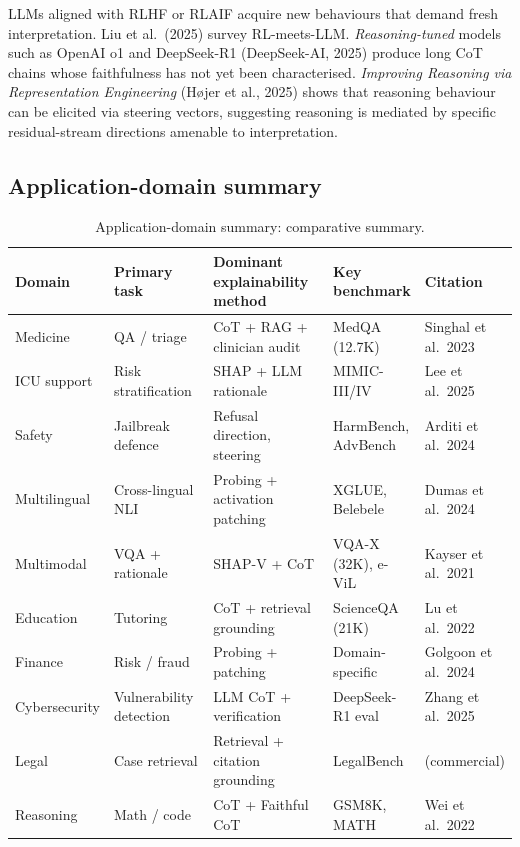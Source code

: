 \documentclass{article}
\begin{document}
LLMs aligned with RLHF or RLAIF acquire new behaviours that demand fresh interpretation. Liu et al.~(2025) survey RL-meets-LLM. \emph{Reasoning-tuned} models such as OpenAI o1 and DeepSeek-R1 (DeepSeek-AI, 2025) produce long CoT chains whose faithfulness has not yet been characterised. \emph{Improving Reasoning via Representation Engineering} (Højer et al., 2025) shows that reasoning behaviour can be elicited via steering vectors, suggesting reasoning is mediated by specific residual-stream directions amenable to interpretation.

\subsection{Application-domain summary}\label{application-domain-summary}

\begin{table}[t]
\centering
\caption{Application-domain summary: comparative summary.}
\label{tab:application-domain-summary}
\begin{tabular}{>{\raggedright\arraybackslash}p{0.1250\linewidth}
  >{\raggedright\arraybackslash}p{0.2212\linewidth}
  >{\raggedright\arraybackslash}p{0.2885\linewidth}
  >{\raggedright\arraybackslash}p{0.1827\linewidth}
  >{\raggedright\arraybackslash}p{0.1827\linewidth}}
\toprule
Domain & Primary task & Dominant explainability method & Key benchmark & Citation \\
\midrule
Medicine & QA / triage & CoT + RAG + clinician audit & MedQA (12.7K) & Singhal et al.~2023 \\
ICU support & Risk stratification & SHAP + LLM rationale & MIMIC-III/IV & Lee et al.~2025 \\
Safety & Jailbreak defence & Refusal direction, steering & HarmBench, AdvBench & Arditi et al.~2024 \\
Multilingual & Cross-lingual NLI & Probing + activation patching & XGLUE, Belebele & Dumas et al.~2024 \\
Multimodal & VQA + rationale & SHAP-V + CoT & VQA-X (32K), e-ViL & Kayser et al.~2021 \\
Education & Tutoring & CoT + retrieval grounding & ScienceQA (21K) & Lu et al.~2022 \\
Finance & Risk / fraud & Probing + patching & Domain-specific & Golgoon et al.~2024 \\
Cybersecurity & Vulnerability detection & LLM CoT + verification & DeepSeek-R1 eval & Zhang et al.~2025 \\
Legal & Case retrieval & Retrieval + citation grounding & LegalBench & (commercial) \\
Reasoning & Math / code & CoT + Faithful CoT & GSM8K, MATH & Wei et al.~2022 \\
\end{tabular}
\end{table}
\end{document}
